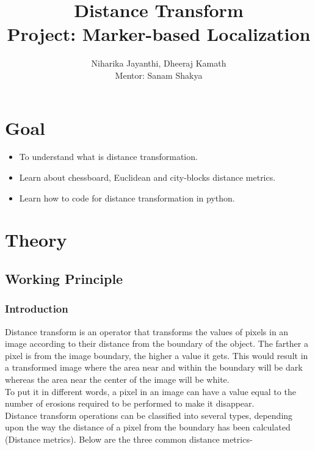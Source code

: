 \documentclass[]{article}
\date{}
\providecommand{\tightlist}{%
  \setlength{\itemsep}{0pt}\setlength{\parskip}{0pt}}
\begin{document}
	\title{\huge\textbf{Distance Transform}\LARGE \\Project: Marker-based Localization}
	\author{Niharika Jayanthi, Dheeraj Kamath \\Mentor: Sanam Shakya}
	\maketitle
	\pagebreak
\section{Goal}\label{goal}

\begin{itemize}
\tightlist
\item
  To understand what is distance transformation.
\item
  Learn about chessboard, Euclidean and city-blocks distance metrics.
\item
  Learn how to code for distance transformation in python.
\end{itemize}

\section{Theory}\label{theory}

\subsection{Working Principle}\label{working-principle}

\subsubsection{Introduction}\label{introduction}

Distance transform is an operator that transforms the values of pixels
in an image according to their distance from the boundary of the object.
The farther a pixel is from the image boundary, the higher a value it
gets. This would result in a transformed image where the area near and
within the boundary will be dark whereas the area near the center of the
image will be white. \\

To put it in different words, a pixel in an image can have a value equal
to the number of erosions required to be performed to make it disappear. \\

Distance transform operations can be classified into several types,
depending upon the way the distance of a pixel from the boundary has
been calculated (Distance metrics). Below are the three common distance
metrics- \\
\end{document}
